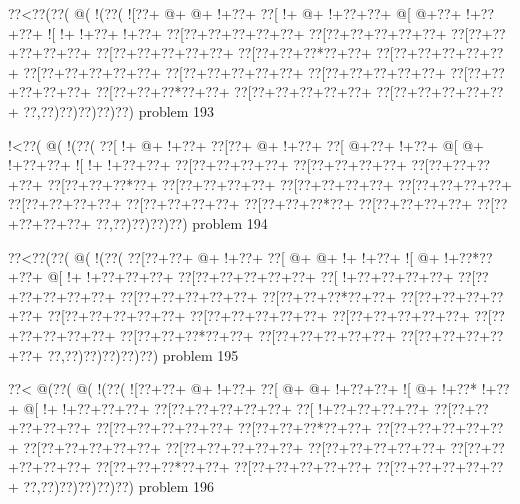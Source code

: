 \vbox{\vbox{\goo
\0??<\0??(\0??(\- @(\- !(\0??(
\- ![\0??+\- @+\- @+\- !+\0??+
\0??[\- !+\- @+\- !+\0??+\0??+
\- @[\- @+\0??+\- !+\0??+\0??+
\- ![\- !+\- !+\0??+\- !+\0??+
\0??[\0??+\0??+\0??+\0??+\0??+
\0??[\0??+\0??+\0??+\0??+\0??+
\0??[\0??+\0??+\0??+\0??+\0??+
\0??[\0??+\0??+\0??+\0??+\0??+
\0??[\0??+\0??+\0??*\0??+\0??+
\0??[\0??+\0??+\0??+\0??+\0??+
\0??[\0??+\0??+\0??+\0??+\0??+
\0??[\0??+\0??+\0??+\0??+\0??+
\0??[\0??+\0??+\0??+\0??+\0??+
\0??[\0??+\0??+\0??+\0??+\0??+
\0??[\0??+\0??+\0??*\0??+\0??+
\0??[\0??+\0??+\0??+\0??+\0??+
\0??[\0??+\0??+\0??+\0??+\0??+
\0??,\0??)\0??)\0??)\0??)\0??)
}
\hfil problem 193\hfil\break
}

\vbox{\vbox{\goo
\- !<\0??(\- @(\- !(\0??(
\0??[\- !+\- @+\- !+\0??+
\0??[\0??+\- @+\- !+\0??+
\0??[\- @+\0??+\- !+\0??+
\- @[\- @+\- !+\0??+\0??+
\- ![\- !+\- !+\0??+\0??+
\0??[\0??+\0??+\0??+\0??+
\0??[\0??+\0??+\0??+\0??+
\0??[\0??+\0??+\0??+\0??+
\0??[\0??+\0??+\0??*\0??+
\0??[\0??+\0??+\0??+\0??+
\0??[\0??+\0??+\0??+\0??+
\0??[\0??+\0??+\0??+\0??+
\0??[\0??+\0??+\0??+\0??+
\0??[\0??+\0??+\0??+\0??+
\0??[\0??+\0??+\0??*\0??+
\0??[\0??+\0??+\0??+\0??+
\0??[\0??+\0??+\0??+\0??+
\0??,\0??)\0??)\0??)\0??)
}
\hfil problem 194\hfil\break
}

\vbox{\vbox{\goo
\0??<\0??(\0??(\- @(\- !(\0??(
\0??[\0??+\0??+\- @+\- !+\0??+
\0??[\- @+\- @+\- !+\- !+\0??+
\- ![\- @+\- !+\0??*\0??+\0??+
\- @[\- !+\- !+\0??+\0??+\0??+
\0??[\0??+\0??+\0??+\0??+\0??+
\0??[\- !+\0??+\0??+\0??+\0??+
\0??[\0??+\0??+\0??+\0??+\0??+
\0??[\0??+\0??+\0??+\0??+\0??+
\0??[\0??+\0??+\0??*\0??+\0??+
\0??[\0??+\0??+\0??+\0??+\0??+
\0??[\0??+\0??+\0??+\0??+\0??+
\0??[\0??+\0??+\0??+\0??+\0??+
\0??[\0??+\0??+\0??+\0??+\0??+
\0??[\0??+\0??+\0??+\0??+\0??+
\0??[\0??+\0??+\0??*\0??+\0??+
\0??[\0??+\0??+\0??+\0??+\0??+
\0??[\0??+\0??+\0??+\0??+\0??+
\0??,\0??)\0??)\0??)\0??)\0??)
}
\hfil problem 195\hfil\break
}

\vbox{\vbox{\goo
\0??<\- @(\0??(\- @(\- !(\0??(
\- ![\0??+\0??+\- @+\- !+\0??+
\0??[\- @+\- @+\- !+\0??+\0??+
\- ![\- @+\- !+\0??*\- !+\0??+
\- @[\- !+\- !+\0??+\0??+\0??+
\0??[\0??+\0??+\0??+\0??+\0??+
\0??[\- !+\0??+\0??+\0??+\0??+
\0??[\0??+\0??+\0??+\0??+\0??+
\0??[\0??+\0??+\0??+\0??+\0??+
\0??[\0??+\0??+\0??*\0??+\0??+
\0??[\0??+\0??+\0??+\0??+\0??+
\0??[\0??+\0??+\0??+\0??+\0??+
\0??[\0??+\0??+\0??+\0??+\0??+
\0??[\0??+\0??+\0??+\0??+\0??+
\0??[\0??+\0??+\0??+\0??+\0??+
\0??[\0??+\0??+\0??*\0??+\0??+
\0??[\0??+\0??+\0??+\0??+\0??+
\0??[\0??+\0??+\0??+\0??+\0??+
\0??,\0??)\0??)\0??)\0??)\0??)
}
\hfil problem 196\hfil\break
}

